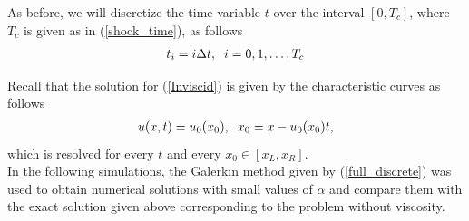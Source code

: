 	As before, we will discretize the time variable $t$ over the interval $[0, T_c]$, where $T_c$ is given as in (\ref{shock_time}), as follows
	\begin{align*}
		t_i = i \Delta t, \hspace{2mm} i = 0, 1, \dots, T_c
	\end{align*}
	
	Recall that the solution for (\ref{Inviscid}) is given by the characteristic curves as follows
	\begin{align}
		u(x, t) = u_0 (x_0), \hspace{2mm} x_0 = x - u_0 (x_0) t, 
	\end{align}
	which is resolved for every $t$ and every $x_0 \in [x_L, x_R]$. \\
	
	In the following simulations, the Galerkin method given by (\ref{full_discrete}) was used to obtain numerical solutions with small values of $\alpha$ and compare them with the exact solution given above corresponding to the problem without viscosity.
	
